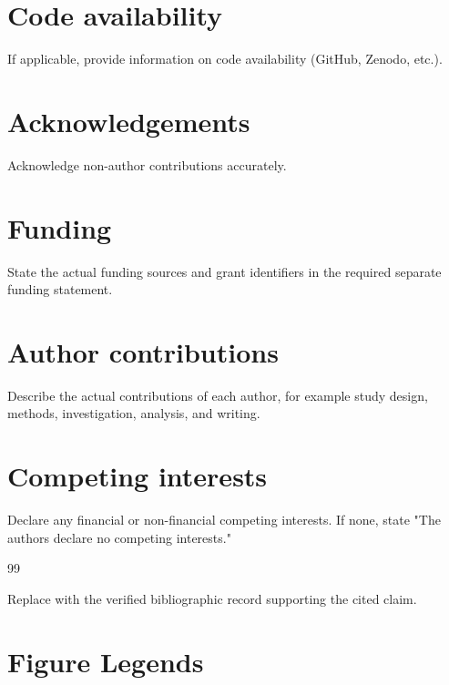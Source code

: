 \documentclass[12pt]{article}
\begin{document}
\section*{Code availability}
If applicable, provide information on code availability (GitHub, Zenodo, etc.).

\section*{Acknowledgements}
Acknowledge non-author contributions accurately.

\section*{Funding}
State the actual funding sources and grant identifiers in the required separate funding statement.

\section*{Author contributions}
Describe the actual contributions of each author, for example study design, methods, investigation, analysis, and writing.

\section*{Competing interests}
Declare any financial or non-financial competing interests. If none, state "The authors declare no competing interests."

% 
% 

\begin{thebibliography}{99}

Replace with the verified bibliographic record supporting the cited claim.


\end{thebibliography}

\section*{Figure Legends}
\end{document}

